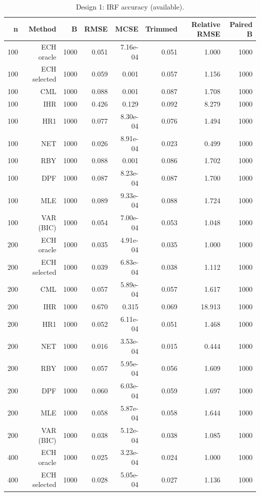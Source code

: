 \begin{table}[p]\centering
\caption{Design 1: IRF accuracy (available).}
\small
\begin{tabular}{rrrrrrrr}\toprule
n & Method & B & RMSE & MCSE & Trimmed & Relative RMSE & Paired B \\\midrule
100 & ECH oracle & 1000 & 0.051 & 7.16e-04 & 0.051 & 1.000 & 1000 \\
100 & ECH selected & 1000 & 0.059 & 0.001 & 0.057 & 1.156 & 1000 \\
100 & CML & 1000 & 0.088 & 0.001 & 0.087 & 1.708 & 1000 \\
100 & IHR & 1000 & 0.426 & 0.129 & 0.092 & 8.279 & 1000 \\
100 & HR1 & 1000 & 0.077 & 8.30e-04 & 0.076 & 1.494 & 1000 \\
100 & NET & 1000 & 0.026 & 8.91e-04 & 0.023 & 0.499 & 1000 \\
100 & RBY & 1000 & 0.088 & 0.001 & 0.086 & 1.702 & 1000 \\
100 & DPF & 1000 & 0.087 & 8.23e-04 & 0.087 & 1.700 & 1000 \\
100 & MLE & 1000 & 0.089 & 9.33e-04 & 0.088 & 1.724 & 1000 \\
100 & VAR (BIC) & 1000 & 0.054 & 7.00e-04 & 0.053 & 1.048 & 1000 \\
200 & ECH oracle & 1000 & 0.035 & 4.91e-04 & 0.035 & 1.000 & 1000 \\
200 & ECH selected & 1000 & 0.039 & 6.83e-04 & 0.038 & 1.112 & 1000 \\
200 & CML & 1000 & 0.057 & 5.89e-04 & 0.057 & 1.617 & 1000 \\
200 & IHR & 1000 & 0.670 & 0.315 & 0.069 & 18.913 & 1000 \\
200 & HR1 & 1000 & 0.052 & 6.11e-04 & 0.051 & 1.468 & 1000 \\
200 & NET & 1000 & 0.016 & 3.53e-04 & 0.015 & 0.444 & 1000 \\
200 & RBY & 1000 & 0.057 & 5.95e-04 & 0.056 & 1.609 & 1000 \\
200 & DPF & 1000 & 0.060 & 6.03e-04 & 0.059 & 1.697 & 1000 \\
200 & MLE & 1000 & 0.058 & 5.87e-04 & 0.058 & 1.644 & 1000 \\
200 & VAR (BIC) & 1000 & 0.038 & 5.12e-04 & 0.038 & 1.085 & 1000 \\
400 & ECH oracle & 1000 & 0.025 & 3.23e-04 & 0.024 & 1.000 & 1000 \\
400 & ECH selected & 1000 & 0.028 & 5.05e-04 & 0.027 & 1.136 & 1000 \\

\end{tabular}
\end{table}

